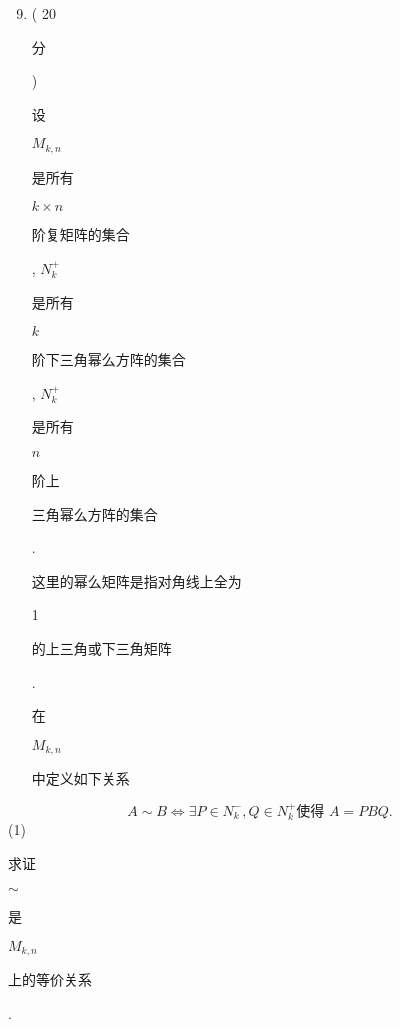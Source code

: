 \documentclass[10pt]{article}
\begin{document}
\begin{enumerate}
  \setcounter{enumi}{8}
  \item ( 20 \begin{CJK}{UTF8}{mj}分\end{CJK}) \begin{CJK}{UTF8}{mj}设\end{CJK} $M_{k, n}$ \begin{CJK}{UTF8}{mj}是所有\end{CJK} $k \times n$ \begin{CJK}{UTF8}{mj}阶复矩阵的集合\end{CJK}, $N_{k}^{+}$\begin{CJK}{UTF8}{mj}是所有\end{CJK} $k$ \begin{CJK}{UTF8}{mj}阶下三角幂么方阵的集合\end{CJK}, $N_{k}^{+}$\begin{CJK}{UTF8}{mj}是所有\end{CJK} $n$ \begin{CJK}{UTF8}{mj}阶上\end{CJK} \begin{CJK}{UTF8}{mj}三角幂么方阵的集合\end{CJK}. \begin{CJK}{UTF8}{mj}这里的幂么矩阵是指对角线上全为\end{CJK} 1 \begin{CJK}{UTF8}{mj}的上三角或下三角矩阵\end{CJK}. \begin{CJK}{UTF8}{mj}在\end{CJK} $M_{k, n}$ \begin{CJK}{UTF8}{mj}中定义如下关系\end{CJK}
\end{enumerate}
$$
A \sim B \Leftrightarrow \exists P \in N_{k}^{-}, Q \in N_{k}^{+} \text {使得 } A=P B Q .
$$
(1) \begin{CJK}{UTF8}{mj}求证\end{CJK} $\sim$ \begin{CJK}{UTF8}{mj}是\end{CJK} $M_{k, n}$ \begin{CJK}{UTF8}{mj}上的等价关系\end{CJK}.
\end{document}
